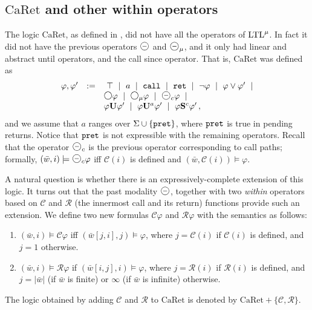 \documentclass{LMCS}
\newcommand{\M}{{\mu}}
\newcommand{\w}{{\bar{w}}}
\newcommand{\dm}{\Diamond}
\newcommand{\C}{{\mathcal{C}}}
\newcommand{\R}{{\mathcal{R}}}
\newcommand{\U}{{\mathbf U}}
\renewcommand{\S}{{\mathbf S}}
\newcommand{\next}{\text{\raisebox{1pt}{$\bigcirc$}}}
\renewcommand{\phi}{\varphi}
\theoremstyle{plain}
\theoremstyle{definition}
\newcommand{\Sc}{\S^c}
\newcommand{\Ur}{\U^a}
\newcommand{\prev}{{\text{\Large $\mathbf{\circleddash}$}}}
\newcommand{\caret}{\text{CaRet}}
\newcommand{\retr}{\mathit{ret}}
\newcommand{\pret}{\tt{pret}}
\newcommand{\ltlv}{\text{\rm LTL}^\M}
\newcommand{\rett}{{\tt ret}}
\newcommand{\call}{{\tt call}}
\renewcommand{\retr}{\rett}
\newcommand{\dmm}{\dm_{\M}}
\newcommand{\dmminus}{\dm^-}
\newcommand{\dmmminus}{\dm_{\M}^-}
\renewcommand{\dm}{\next}
\renewcommand{\dmminus}{\prev}
\renewcommand{\dmm}{\dm_\M}
\renewcommand{\dmmminus}{\dmminus_{\M}}
\begin{document}
\subsection{\texorpdfstring{$\caret$}{CaRet} and other within operators}

\newcommand{\first}{{\tt first}}

The logic $\caret$, as defined in \cite{AEM04}, did not have all the
operators of $\ltlv$. In fact it did not have the previous operators
$\dmminus$ and $\dmmminus$, and it only had linear and abstract until
operators, and the call since operator.
That is, $\caret$ was defined as 
$$
\begin{array}{rcl} 
  \phi,\phi' & := &  \ \top\ \mid\ a \ \mid \ \call\ \mid\ 
 \retr\ \mid\ \neg \phi \ \mid \ \phi \vee \phi' \
  \mid \\ 
&& \dm \phi \ \mid \  \dmm \phi \ \mid \ \dmminus_c \phi \ \mid\\
&& \phi \Ul \phi'  \ \mid \   \phi\Ur\phi'\ \mid\  \phi\Sc\phi'\,,
\end{array}
$$
and we assume that $a$ ranges over $\Sigma\cup\{\pret\}$, 
where $\pret$
  is true in pending returns. Notice that $\pret$ is not expressible
  with the remaining operators. Recall that the operator $\dmminus_c$
  is the previous operator corresponding to call paths; formally,
  $(\w, i) \models \dmminus_c \phi$ iff $\C(i)$ is defined and $(\w,
  \C(i)) \models \phi$.

A natural question is whether there is an expressively-complete
extension of this logic. It turns out that the past modality
$\dmminus$, together with two {\em within} operators
based on $\C$ and $\R$ (the innermost call and its return) functions
provide such an extension.  
We
define two new formulas $\C \phi$ and $\R\phi$ with the semantics as
follows: 

\begin{enumerate}[$\bullet$]

\item $(\w,i) \models \C \phi$
iff $(\w[j,i],j) \models \phi$, where $j = \C(i)$ if $\C(i)$ is
defined, and $j = 1$ otherwise.

\item $(\w,i) \models \R \phi$ if $(\w[i,j],i) \models \phi$, 
where $j = \R(i)$ if $\R(i)$ is defined, and $j=|\w|$ (if $\w$ is
finite) or $\infty$ (if $\w$ is infinite) otherwise. 
\end{enumerate}



The logic obtained by adding $\C$ and $\R$ to $\caret$ is denoted by
$\caret+\{\C,\R\}$. 
\end{document}

